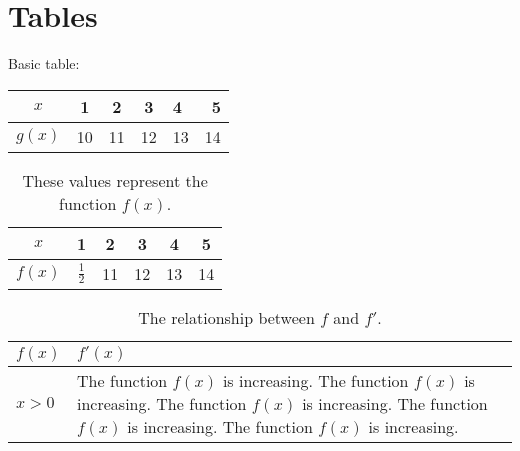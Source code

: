 \maketitle
\section{Tables}
Basic table:\\

\begin{tabular}{|c||c|c|c|l|r|}  %
\hline
$x$ & 1 & 2 & 3 & 4 & 5 \\ \hline
$g(x)$ & 10 & 11 & 12 & 13 & 14 \\ \hline
\end{tabular}

\begin{table}[H]
\centering
\def\arraystretch{1.5} %
\begin{tabular}{|c||c|c|c|c|c|}
\hline
$x$ & 1 & 2 & 3 & 4 & 5 \\ \hline
$f(x)$ & $\frac{1}{2}$ & 11 & 12 & 13 & 14 \\ \hline
\end{tabular}
\caption{These values represent the function $f(x)$.}
\end{table}


\begin{table}[H]
\centering
\caption{The relationship between $f$ and $f'$.}
\def\arraystretch{1.5}
\begin{tabular}{|l|p{5cm}|} %
\hline
$f(x)$ & $f'(x)$ \\ \hline
$x>0$ & The function $f(x)$ is increasing. The function $f(x)$ is increasing. The function $f(x)$ is increasing. The function $f(x)$ is increasing. The function $f(x)$ is increasing. \\ \hline
\end{tabular}
\end{table}